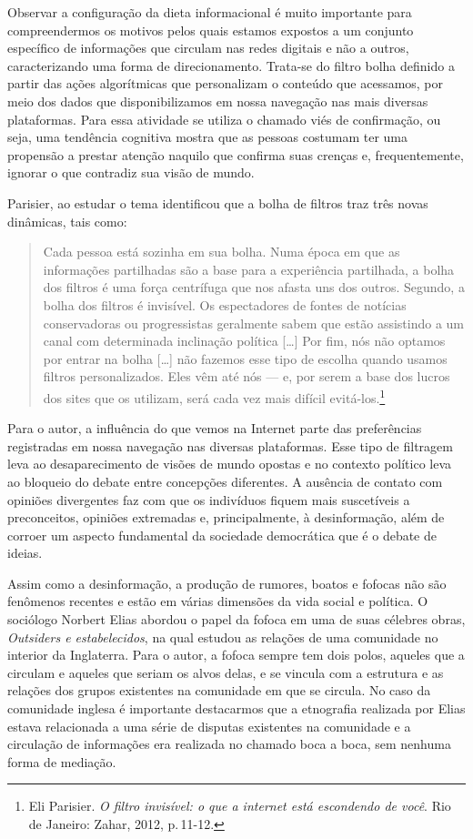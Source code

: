 Observar a configuração da dieta informacional é muito importante para
compreendermos os motivos pelos quais estamos expostos a um conjunto
específico de informações que circulam nas redes digitais e não a
outros, caracterizando uma forma de direcionamento. Trata-se do filtro
bolha definido a partir das ações algorítmicas que personalizam o
conteúdo que acessamos, por meio dos dados que disponibilizamos em nossa
navegação nas mais diversas plataformas. Para essa atividade se utiliza
o chamado viés de confirmação, ou seja, uma tendência cognitiva mostra
que as pessoas costumam ter uma propensão a prestar atenção naquilo que
confirma suas crenças e, frequentemente, ignorar o que contradiz sua
visão de mundo.

Parisier, ao estudar o tema identificou que a bolha de filtros
traz três novas dinâmicas, tais como:

\begin{quote}
Cada pessoa está sozinha em sua bolha. Numa época em que as informações
partilhadas são a base para a experiência partilhada, a bolha dos
filtros é uma força centrífuga que nos afasta uns dos outros. Segundo, a
bolha dos filtros é invisível. Os espectadores de fontes de notícias
conservadoras ou progressistas geralmente sabem que estão assistindo a
um canal com determinada inclinação política {[}\ldots{]} Por fim, nós não
optamos por entrar na bolha {[}\ldots{]} não fazemos esse tipo de escolha quando
usamos filtros personalizados. Eles vêm até nós --- e, por serem a base
dos lucros dos sites que os utilizam, será cada vez mais difícil
evitá-los.\footnote{Eli Parisier. \textit{O filtro invisível: o que a internet está
escondendo de você}. Rio de Janeiro: Zahar, 2012, p.\,11-12.}
\end{quote}

Para o autor, a influência do que vemos na Internet parte das
preferências registradas em nossa navegação nas diversas plataformas.
Esse tipo de filtragem leva ao desaparecimento de visões de mundo
opostas e no contexto político leva ao bloqueio do debate entre
concepções diferentes. A ausência de contato com opiniões divergentes
faz com que os indivíduos fiquem mais suscetíveis a preconceitos,
opiniões extremadas e, principalmente, à desinformação, além de corroer
um aspecto fundamental da sociedade democrática que é o debate de
ideias.

Assim como a desinformação, a produção de rumores, boatos e fofocas não
são fenômenos recentes e estão em várias dimensões da vida social e
política. O sociólogo Norbert Elias abordou o papel da fofoca em uma de
suas célebres obras, \textit{Outsiders e estabelecidos}, na qual estudou
as relações de uma comunidade no interior da Inglaterra. Para o autor, a
fofoca sempre tem dois polos, aqueles que a circulam e aqueles que
seriam os alvos delas, e se vincula com a estrutura e as relações dos
grupos existentes na comunidade em que se circula. No caso da comunidade
inglesa é importante destacarmos que a etnografia realizada por Elias
estava relacionada a uma série de disputas existentes na comunidade e a
circulação de informações era realizada no chamado boca a boca, sem
nenhuma forma de mediação.

